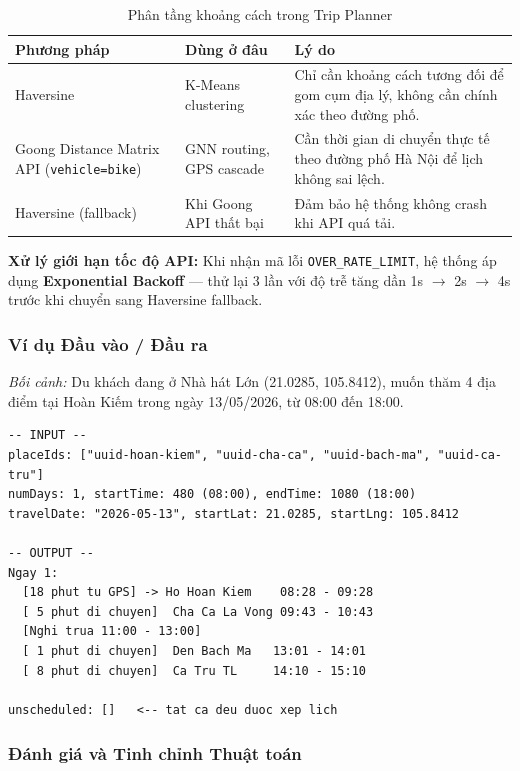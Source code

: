 \documentclass[12pt,a4paper]{article}
\begin{document}
\begin{table}[H]
\centering
\renewcommand{\arraystretch}{1.3}
\begin{tabular}{@{} p{} p{} p{} @{}}
\toprule
\textbf{Phương pháp} & \textbf{Dùng ở đâu} & \textbf{Lý do} \\
\midrule
Haversine & K-Means clustering & Chỉ cần khoảng cách tương đối để gom cụm địa lý, không cần chính xác theo đường phố. \\
\addlinespace
Goong Distance Matrix API (\texttt{vehicle=bike}) & GNN routing, GPS cascade & Cần thời gian di chuyển thực tế theo đường phố Hà Nội để lịch không sai lệch. \\
\addlinespace
Haversine (fallback) & Khi Goong API thất bại & Đảm bảo hệ thống không crash khi API quá tải. \\
\bottomrule
\end{tabular}
\caption{Phân tầng khoảng cách trong Trip Planner}
\end{table}

\textbf{Xử lý giới hạn tốc độ API:} Khi nhận mã lỗi \texttt{OVER\_RATE\_LIMIT},
hệ thống áp dụng \textbf{Exponential Backoff} --- thử lại 3 lần với độ trễ
tăng dần 1s $\to$ 2s $\to$ 4s trước khi chuyển sang Haversine fallback.

\subsubsection{Ví dụ Đầu vào / Đầu ra}

\textit{Bối cảnh:} Du khách đang ở Nhà hát Lớn (21.0285, 105.8412), muốn thăm
4 địa điểm tại Hoàn Kiếm trong ngày 13/05/2026, từ 08:00 đến 18:00.

\begin{lstlisting}[language={}]
-- INPUT --
placeIds: ["uuid-hoan-kiem", "uuid-cha-ca", "uuid-bach-ma", "uuid-ca-tru"]
numDays: 1, startTime: 480 (08:00), endTime: 1080 (18:00)
travelDate: "2026-05-13", startLat: 21.0285, startLng: 105.8412

-- OUTPUT --
Ngay 1:
  [18 phut tu GPS] -> Ho Hoan Kiem    08:28 - 09:28
  [ 5 phut di chuyen]  Cha Ca La Vong 09:43 - 10:43
  [Nghi trua 11:00 - 13:00]
  [ 1 phut di chuyen]  Den Bach Ma   13:01 - 14:01
  [ 8 phut di chuyen]  Ca Tru TL     14:10 - 15:10

unscheduled: []   <-- tat ca deu duoc xep lich
\end{lstlisting}

\subsubsection{Đánh giá và Tinh chỉnh Thuật toán}
\end{document}
